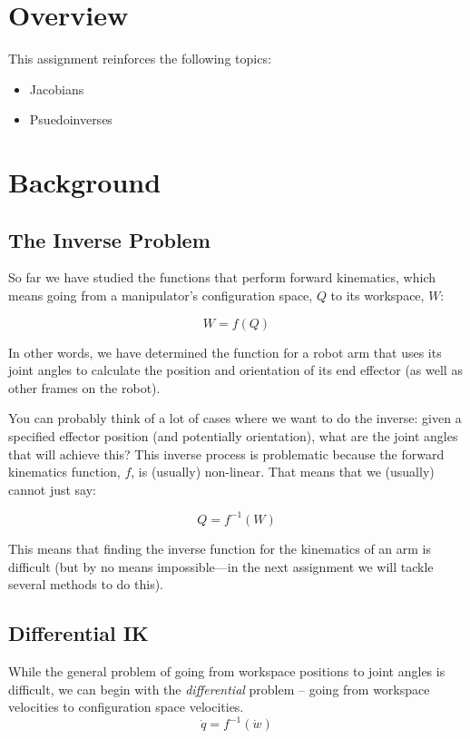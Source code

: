 \documentclass{16384_doc} %
\begin{document}
\maketitle

\tableofcontents

\section{Overview}
This assignment reinforces the following topics:
\begin{itemize}

\item Jacobians
\item Psuedoinverses

\end{itemize}

\section{Background}

\subsection{The Inverse Problem}
So far we have studied the functions that perform forward kinematics, which
means going from a manipulator's configuration space, $Q$ to its workspace, $W$:

\[
W = f(Q)
\]

\noindent In other words, we have determined the function for a robot arm that uses its
joint angles to calculate the position and orientation of its end effector (as
well as other frames on the robot).

You can probably think of a lot of cases where we want to do the inverse: given
a specified effector position (and potentially orientation), what are the joint
angles that will achieve this?  This inverse process is problematic because the
forward kinematics function, $f$, is (usually) non-linear.  That means that we
(usually) cannot just say:

\[
Q = f^{-1}(W)
\]

This means that finding the inverse function for the kinematics of an arm is
difficult (but by no means impossible---in the next assignment we will
tackle several methods to do this).

\subsection{Differential IK}
While the general problem of going from workspace positions to joint angles is
difficult, we can begin with the \emph{differential} problem -- going from
workspace velocities to configuration space velocities.
\[
\dot q = f^{-1}(\dot w)
\]
\end{document}
